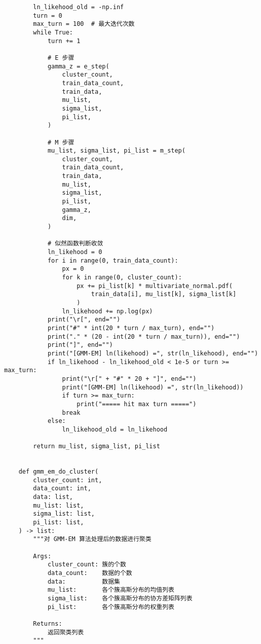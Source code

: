 \begin{verbatim}
        ln_likehood_old = -np.inf
        turn = 0
        max_turn = 100  # 最大迭代次数
        while True:
            turn += 1

            # E 步骤
            gamma_z = e_step(
                cluster_count,
                train_data_count,
                train_data,
                mu_list,
                sigma_list,
                pi_list,
            )

            # M 步骤
            mu_list, sigma_list, pi_list = m_step(
                cluster_count,
                train_data_count,
                train_data,
                mu_list,
                sigma_list,
                pi_list,
                gamma_z,
                dim,
            )

            # 似然函数判断收敛
            ln_likehood = 0
            for i in range(0, train_data_count):
                px = 0
                for k in range(0, cluster_count):
                    px += pi_list[k] * multivariate_normal.pdf(
                        train_data[i], mu_list[k], sigma_list[k]
                    )
                ln_likehood += np.log(px)
            print("\r[", end="")
            print("#" * int(20 * turn / max_turn), end="")
            print("." * (20 - int(20 * turn / max_turn)), end="")
            print("]", end="")
            print("[GMM-EM] ln(likehood) =", str(ln_likehood), end="")
            if ln_likehood - ln_likehood_old < 1e-5 or turn >= max_turn:
                print("\r[" + "#" * 20 + "]", end="")
                print("[GMM-EM] ln(likehood) =", str(ln_likehood))
                if turn >= max_turn:
                    print("===== hit max turn =====")
                break
            else:
                ln_likehood_old = ln_likehood

        return mu_list, sigma_list, pi_list


    def gmm_em_do_cluster(
        cluster_count: int,
        data_count: int,
        data: list,
        mu_list: list,
        sigma_list: list,
        pi_list: list,
    ) -> list:
        """对 GMM-EM 算法处理后的数据进行聚类

        Args:
            cluster_count: 簇的个数
            data_count:    数据的个数
            data:          数据集
            mu_list:       各个簇高斯分布的均值列表
            sigma_list:    各个簇高斯分布的协方差矩阵列表
            pi_list:       各个簇高斯分布的权重列表

        Returns:
            返回聚类列表
        """


\end{verbatim}
